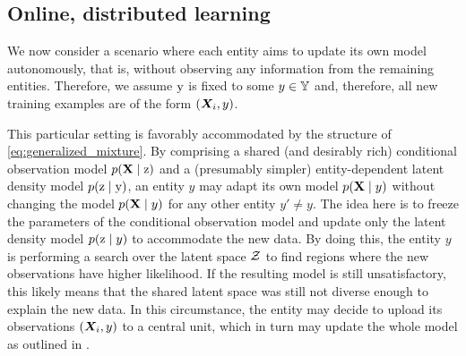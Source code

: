 \subsection{Online, distributed learning}
\label{sec:distributed_learning}

We now consider a scenario where each entity aims to update its own model autonomously, that is, without observing any information from the remaining entities. Therefore, we assume ${\textnormal{y}}$ is fixed to some $y \in {\mathbb{Y}}$ and, therefore, all new training examples are of the form $({\bm{X}}_i, y)$.

This particular setting is favorably accommodated by the structure of \eqref{eq:generalized_mixture}. By comprising a shared (and desirably rich) conditional observation model $p({\mathbf{X}} \mid {\textnormal{z}})$ and a (presumably simpler) entity-dependent latent density model $p({\textnormal{z}} \mid {\textnormal{y}})$, an entity $y$ may adapt its own model $p({\mathbf{X}} \mid y)$ without changing the model $p({\mathbf{X}} \mid y)$ for any other entity $y' \neq y$. The idea here is to freeze the parameters of the conditional observation model and update only the latent density model $p({\textnormal{z}} \mid y)$ to accommodate the new data. By doing this, the entity $y$ is performing a search over the latent space ${\mathcal{Z}}$ to find regions where the new observations have higher likelihood. If the resulting model is still unsatisfactory, this likely means that the shared latent space was still not diverse enough to explain the new data. In this circumstance, the entity may decide to upload its observations $({\bm{X}}_i, y)$ to a central unit, which in turn may update the whole model as outlined in .
